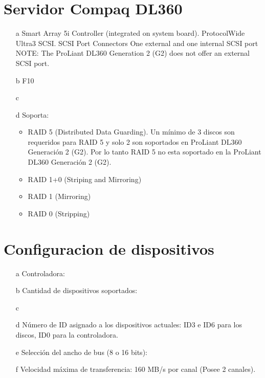 \documentclass[a4paper]{article}
\begin{document}
\section{Servidor Compaq DL360}
\begin{enumerate}
\item[a] Smart Array 5i Controller (integrated on system board).
ProtocolWide Ultra3 SCSI. SCSI Port Connectors One external and one internal SCSI port
NOTE: The ProLiant DL360 Generation 2 (G2) does not offer an external SCSI port.
\item[b] F10
\item[c] 
\item[d] Soporta: \begin{itemize}
\item RAID 5 (Distributed Data Guarding). Un mínimo de 3 discos son requeridos para RAID 5 y solo 2 son soportados en ProLiant DL360 Generación 2 (G2). Por lo tanto RAID 5 no esta soportado en la ProLiant DL360 Generación 2 (G2).
\item RAID 1+0 (Striping and Mirroring)
\item RAID 1 (Mirroring)
\item RAID 0 (Stripping)
\end{itemize}
\end{enumerate}
%
\section{Configuracion de dispositivos}
\begin{enumerate}
\item[a] Controladora: 
\item[b] Cantidad de dispositivos soportados: 
\item[c] 
\item[d] Número de ID asignado a los dispositivos actuales: ID3 e ID6 para los discos, ID0 para la controladora.
\item[e] Selección del ancho de bus (8 o 16 bits): 
\item[f] Velocidad máxima de transferencia: 160 MB/s por canal (Posee 2 canales).
\end{enumerate}
%
\end{document}
